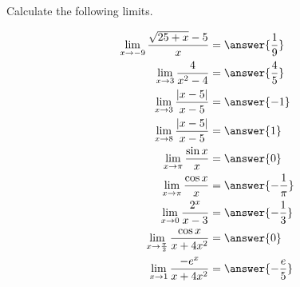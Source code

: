 \documentclass{ximera}
\author{Nela Lakos \and Kyle Parsons}
\begin{document}
\begin{exercise}

Calculate the following limits.

\begin{align*}
\lim_{x\to-9}\frac{\sqrt{25+x} -5}{x} &= \answer{\frac{1}{9}}\\
\lim_{x\to3}\frac{4}{x^2-4} &= \answer{\frac{4}{5}}\\
\lim_{x\to3}\frac{\left|x-5\right|}{x-5} &= \answer{-1}\\
\lim_{x\to8}\frac{\left|x-5\right|}{x-5} &= \answer{1}\\
\lim_{x\to\pi}\frac{\sin{x}}{x} &= \answer{0}\\
\lim_{x\to\pi}\frac{\cos{x}}{x} &= \answer{-\frac{1}{\pi}}\\
\lim_{x\to0}\frac{2^x}{x-3} &= \answer{-\frac{1}{3}}\\
\lim_{x\to\frac{\pi}{2}} \frac{\cos x}{x+4x^2} &= \answer{{0}}\\
\lim_{x\to1}\frac{-e^x}{x+4x^2} &= \answer{-\frac{e}{5}}
\end{align*}

\end{exercise}
\end{document}
